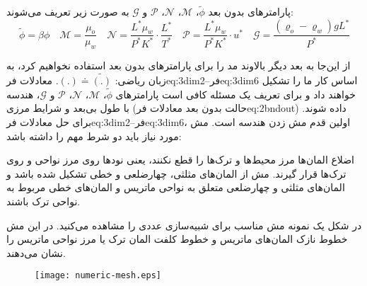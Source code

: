 پارامتر‌های بدون بعد
$\tilde{\phi}$، $\mathcal{M}$، $\mathcal{N}$، $\mathcal{P} $ و $\mathcal{G}$
به صورت زیر تعریف می‌شوند:
\begin{equation}
\label{eq:3dim7}
\tilde{\phi}=\beta\phi \quad
\mathcal{M}= \frac{\mu_o}{\mu_w}\quad
\mathcal{N}= \frac{L^*\mu_w}{P^* K^*} \cdot \frac{L^*}{T^*} \quad
\mathcal{P}= \frac{L^*\mu_w}{P^* K^*} \cdot u^* \quad
\mathcal{G}= \frac{(\varrho_o - \varrho_w) g L^*}{P^*} 
\end{equation}

از این‌جا به بعد دیگر بالاوند مد را برای پارامتر‌های بدون بعد استفاده نخواهیم کرد، به زبان ریاضی:  
$(.) \doteq \tilde{(.)}$.
معادلات ‌فر{eq:3dim2}--‌فر{eq:3dim6} اساس کار ما را تشکیل خواهند داد و برای تعریف یک مسئله کافی است پارامتر‌های $\tilde{\phi}$، $\mathcal{M}$، $\mathcal{N}$، $\mathcal{P} $ و $\mathcal{G}$، هندسه با طول بی‌بعد و شرایط مرزی (حالت بدون بعد معادلات ‌فر{eq:2bndout}) داده شوند.
برای حل معادلات ‌فر{eq:3dim2}--‌فر{eq:3dim6}، اولین قدم مش زدن هندسه است. مش مورد نیاز باید دو شرط مهم را داشته باشد:
\begin{tight_enumerate}
 اضلاع المان‌ها مرز محیط‌ها و ترک‌ها را قطع نکنند، یعنی نود‌ها روی مرز نواحی و روی ترک‌ها قرار گیرند.
 مش از المان‌های مثلثی، چهار‌ضلعی‌ و خطی تشکیل شده باشد و المان‌های مثلثی و چهارضلعی متعلق به نواحی ماتریس و المان‌های خطی مربوط به نواحی ترک باشند.
\end{tight_enumerate}
در شکل  یک نمونه مش مناسب برای شبیه‌سازی عددی را مشاهده می‌کنید. در این مش خطوط نازک المان‌های ماتریس و خطوط کلفت المان ترک یا مرز نواحی ماتریس را نشان می‌دهند.

\begin{figure}
\texttt{[image: numeric-mesh.eps]}
\label{fig:3mesh}
\end{figure}

